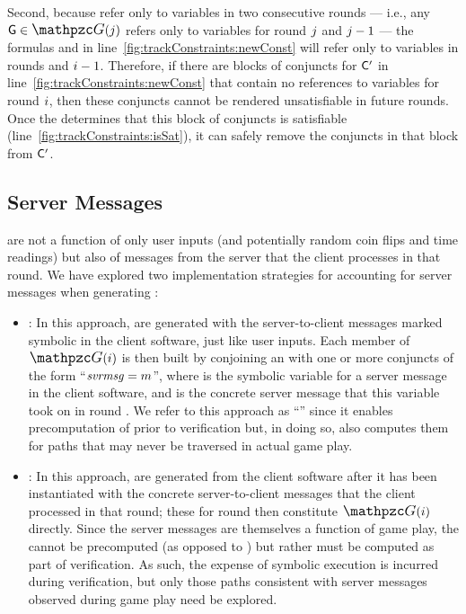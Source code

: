 Second, because \pathsegcons refer only to variables in two
consecutive rounds --- i.e., any $\genericPathConstraint \in
\genericPathConstraints(\genidx)$ refers only to variables for round
$j$ and $j-1$ --- the formulas \genericPathConstraint and
\msgConstraint in line~\ref{fig:trackConstraints:newConst} will refer
only to variables in rounds \roundidx and $i-1$.  Therefore,
if there are blocks of conjuncts for $\mathsf C'$ in
line~\ref{fig:trackConstraints:newConst} that contain no references to
variables for round $i$, then these conjuncts cannot be
rendered unsatisfiable in future rounds.  Once the \verifier determines
that this block of conjuncts is satisfiable
(line~\ref{fig:trackConstraints:isSat}), it can safely remove the
conjuncts in that block from $\mathsf C'$.

\subsection{Server Messages}
\label{ssec:scv:approach:messages}

\Pathsegcons are not a function of only user inputs (and potentially
random coin flips and time readings) but also of messages from the
server that the client processes in that round.  We have explored two
implementation strategies for accounting for server messages when
generating \pathsegcons:
\begin{itemize}
\item {\em \Eager}: In this approach, {\em \eager \pathsegcons} are
  generated with the server-to-client messages marked symbolic in the
  client software, just like user inputs.  Each member of
  $\genericPathConstraints(\roundidx)$ is then built by conjoining an
  \eager \pathsegcon with one or more conjuncts of the form
  ``$\mathit{svrmsg} = m$'', where \servermsgvar is the
  symbolic variable for a server message in the client software, and
  \servermsgval is the concrete server message that this variable took
  on in round \roundidx.  We refer to this approach as ``\eager''
  since it enables precomputation of \pathsegcons prior to
  verification but, in doing so, also computes them for paths that may
  never be traversed in actual game play.

\item {\em \Lazy}: In this approach, {\em \lazy \pathsegcons} are
  generated from the client software after it has been instantiated
  with the concrete server-to-client messages that the client
  processed in that round; these \pathsegcons for round \roundidx then
  constitute $\genericPathConstraints(\roundidx)$ directly. Since the
  server messages are themselves a function of game play, the \lazy
  \pathsegcons cannot be precomputed (as opposed to \eager
  \pathsegcons) but rather must be computed as part of verification.
  As such, the expense of symbolic execution is incurred during
  verification, but only those paths consistent with server messages
  observed during game play need be explored.
\end{itemize}

